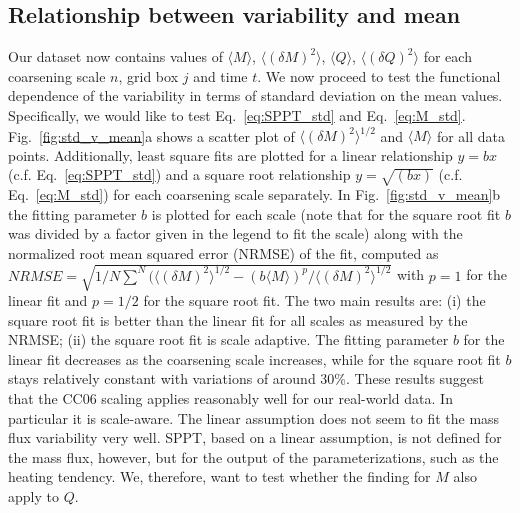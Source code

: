 \documentclass[a4paper, 12pt]{article}
\begin{document}
\subsection{Relationship between variability and mean}
Our dataset now contains values of $\langle M \rangle$, $\langle (\delta M )^2 \rangle$, $\langle Q \rangle$, $\langle (\delta Q )^2 \rangle$ for each coarsening scale $n$, grid box $j$ and time $t$. We now proceed to test the functional dependence of the variability in terms of standard deviation on the mean values. Specifically, we would like to test Eq.~\ref{eq:SPPT_std} and Eq.~\ref{eq:M_std}. Fig.~\ref{fig:std_v_mean}a shows a scatter plot of $\langle (\delta M )^2 \rangle^{1/2}$ and $\langle M \rangle$ for all data points. Additionally, least square fits are plotted for a linear relationship $y = bx$ (c.f. Eq.~\ref{eq:SPPT_std}) and a square root relationship $y = \sqrt{(bx)}$ (c.f. Eq.~\ref{eq:M_std}) for each coarsening scale separately. In Fig.~\ref{fig:std_v_mean}b the fitting parameter $b$ is plotted for each scale (note that for the square root fit $b$ was divided by a factor given in the legend to fit the scale) along with the normalized root mean squared error (NRMSE) of the fit, computed as $NRMSE = \sqrt{1/N \sum^N (\langle (\delta M )^2 \rangle^{1/2} - (b\langle M \rangle)^p/\langle (\delta M )^2 \rangle^{1/2}}$ with $p=1$ for the linear fit and $p=1/2$ for the square root fit. The two main results are: (i) the square root fit is better than the linear fit for all scales as measured by the NRMSE; (ii) the square root fit is scale adaptive. The fitting parameter $b$ for the linear fit decreases as the coarsening scale increases, while for the square root fit $b$ stays relatively constant with variations of around 30\%. These results suggest that the CC06 scaling applies reasonably well for our real-world data. In particular it is scale-aware. The linear assumption does not seem to fit the mass flux variability very well. SPPT, based on a linear assumption, is not defined for the mass flux, however, but for the output of the parameterizations, such as the heating tendency. We, therefore, want to test whether the finding for $M$ also apply to $Q$.
\end{document}
